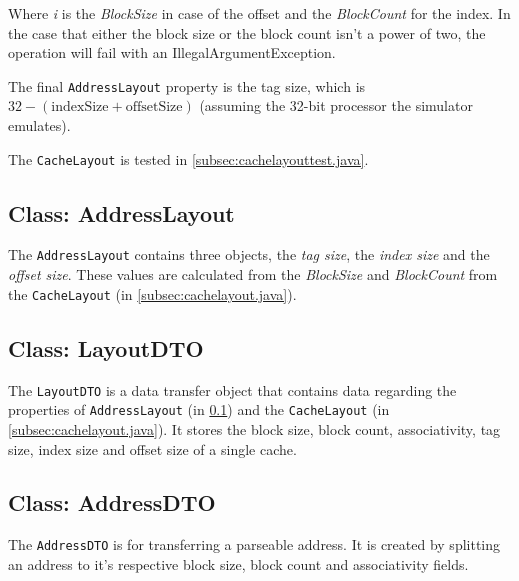 \documentclass[a4paper]{scrreprt}
\begin{document}
Where \textit{i} is the \textit{BlockSize} in case of the offset and the \textit{BlockCount} for the index. In the case that either the block size or the block count isn't a power of two, the operation will fail with an IllegalArgumentException.

The final \texttt{AddressLayout} property is the tag size, which is $32 - (\text{indexSize} + \text{offsetSize})$ (assuming the 32-bit processor the simulator emulates).

The \texttt{CacheLayout} is tested in \ref{subsec:cachelayouttest.java}.



\subsection{Class: AddressLayout}
\label{subsec:addresslayout.java}

The \texttt{AddressLayout} contains three objects, the \textit{tag size}, the \textit{index size} and the \textit{offset size}. These values are calculated from the \textit{BlockSize} and \textit{BlockCount} from the \texttt{CacheLayout} (in \ref{subsec:cachelayout.java}).



\subsection{Class: LayoutDTO}
\label{subsec:layoutdto.java}

The \texttt{LayoutDTO} is a data transfer object that contains data regarding the properties of \texttt{AddressLayout} (in \ref{subsec:addresslayout.java}) and the \texttt{CacheLayout} (in \ref{subsec:cachelayout.java}). It stores the block size, block count, associativity, tag size, index size and offset size of a single cache.



\subsection{Class: AddressDTO}
\label{subsec:addressdto.java}

The \texttt{AddressDTO} is for transferring a parseable address. It is created by splitting an address to it's respective block size, block count and associativity fields.
\end{document}
